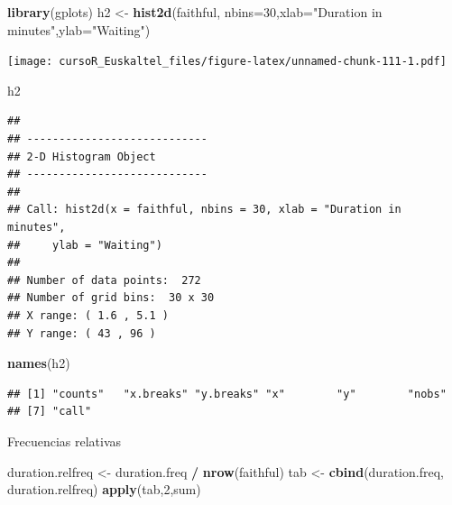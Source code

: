 \documentclass[]{book}
\newenvironment{Shaded}{\begin{snugshade}}{\end{snugshade}}
\newcommand{\KeywordTok}[1]{\textcolor[rgb]{0.13,0.29,0.53}{\textbf{#1}}}
\newcommand{\DataTypeTok}[1]{\textcolor[rgb]{0.13,0.29,0.53}{#1}}
\newcommand{\DecValTok}[1]{\textcolor[rgb]{0.00,0.00,0.81}{#1}}
\newcommand{\StringTok}[1]{\textcolor[rgb]{0.31,0.60,0.02}{#1}}
\newcommand{\OperatorTok}[1]{\textcolor[rgb]{0.81,0.36,0.00}{\textbf{#1}}}
\newcommand{\NormalTok}[1]{#1}
\begin{document}
\begin{Shaded}
\begin{Highlighting}[]
\KeywordTok{library}\NormalTok{(gplots)}
\NormalTok{h2 <-}\StringTok{ }\KeywordTok{hist2d}\NormalTok{(faithful, }\DataTypeTok{nbins=}\DecValTok{30}\NormalTok{,}\DataTypeTok{xlab=}\StringTok{"Duration in minutes"}\NormalTok{,}\DataTypeTok{ylab=}\StringTok{"Waiting"}\NormalTok{)}
\end{Highlighting}
\end{Shaded}

\texttt{[image: cursoR\_Euskaltel\_files/figure-latex/unnamed-chunk-111-1.pdf]}

\begin{Shaded}
\begin{Highlighting}[]
\NormalTok{h2}
\end{Highlighting}
\end{Shaded}

\begin{verbatim}
## 
## ----------------------------
## 2-D Histogram Object
## ----------------------------
## 
## Call: hist2d(x = faithful, nbins = 30, xlab = "Duration in minutes", 
##     ylab = "Waiting")
## 
## Number of data points:  272 
## Number of grid bins:  30 x 30 
## X range: ( 1.6 , 5.1 )
## Y range: ( 43 , 96 )
\end{verbatim}

\begin{Shaded}
\begin{Highlighting}[]
\KeywordTok{names}\NormalTok{(h2)}
\end{Highlighting}
\end{Shaded}

\begin{verbatim}
## [1] "counts"   "x.breaks" "y.breaks" "x"        "y"        "nobs"    
## [7] "call"
\end{verbatim}

Frecuencias relativas

\begin{Shaded}
\begin{Highlighting}[]
\NormalTok{duration.relfreq <-}\StringTok{ }\NormalTok{duration.freq }\OperatorTok{/}\StringTok{ }\KeywordTok{nrow}\NormalTok{(faithful) }
\NormalTok{tab <-}\StringTok{ }\KeywordTok{cbind}\NormalTok{(duration.freq, duration.relfreq) }
\KeywordTok{apply}\NormalTok{(tab,}\DecValTok{2}\NormalTok{,sum)}
\end{Highlighting}
\end{Shaded}
\end{document}
